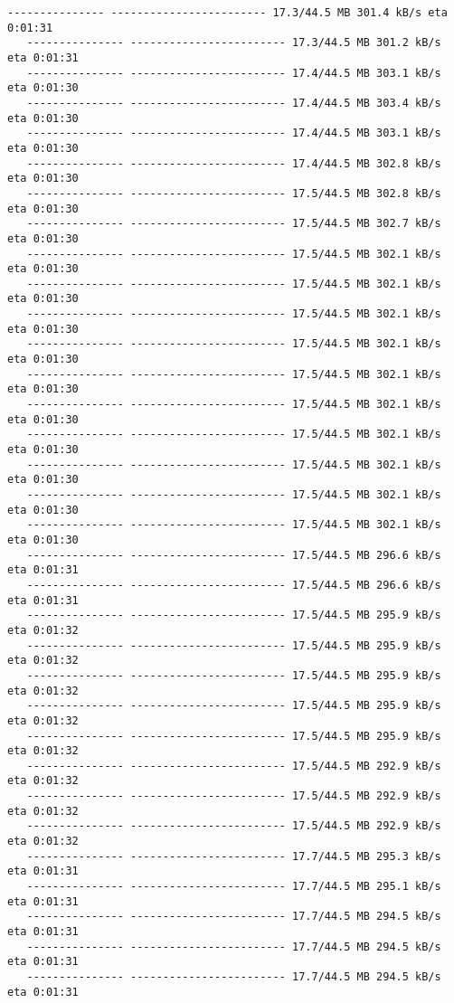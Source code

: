 \documentclass[11pt]{article}
\begin{document}
\begin{Verbatim}[commandchars=\\\{\}]
   --------------- ------------------------ 17.3/44.5 MB 301.4 kB/s eta 0:01:31
   --------------- ------------------------ 17.3/44.5 MB 301.2 kB/s eta 0:01:31
   --------------- ------------------------ 17.4/44.5 MB 303.1 kB/s eta 0:01:30
   --------------- ------------------------ 17.4/44.5 MB 303.4 kB/s eta 0:01:30
   --------------- ------------------------ 17.4/44.5 MB 303.1 kB/s eta 0:01:30
   --------------- ------------------------ 17.4/44.5 MB 302.8 kB/s eta 0:01:30
   --------------- ------------------------ 17.5/44.5 MB 302.8 kB/s eta 0:01:30
   --------------- ------------------------ 17.5/44.5 MB 302.7 kB/s eta 0:01:30
   --------------- ------------------------ 17.5/44.5 MB 302.1 kB/s eta 0:01:30
   --------------- ------------------------ 17.5/44.5 MB 302.1 kB/s eta 0:01:30
   --------------- ------------------------ 17.5/44.5 MB 302.1 kB/s eta 0:01:30
   --------------- ------------------------ 17.5/44.5 MB 302.1 kB/s eta 0:01:30
   --------------- ------------------------ 17.5/44.5 MB 302.1 kB/s eta 0:01:30
   --------------- ------------------------ 17.5/44.5 MB 302.1 kB/s eta 0:01:30
   --------------- ------------------------ 17.5/44.5 MB 302.1 kB/s eta 0:01:30
   --------------- ------------------------ 17.5/44.5 MB 302.1 kB/s eta 0:01:30
   --------------- ------------------------ 17.5/44.5 MB 302.1 kB/s eta 0:01:30
   --------------- ------------------------ 17.5/44.5 MB 302.1 kB/s eta 0:01:30
   --------------- ------------------------ 17.5/44.5 MB 296.6 kB/s eta 0:01:31
   --------------- ------------------------ 17.5/44.5 MB 296.6 kB/s eta 0:01:31
   --------------- ------------------------ 17.5/44.5 MB 295.9 kB/s eta 0:01:32
   --------------- ------------------------ 17.5/44.5 MB 295.9 kB/s eta 0:01:32
   --------------- ------------------------ 17.5/44.5 MB 295.9 kB/s eta 0:01:32
   --------------- ------------------------ 17.5/44.5 MB 295.9 kB/s eta 0:01:32
   --------------- ------------------------ 17.5/44.5 MB 295.9 kB/s eta 0:01:32
   --------------- ------------------------ 17.5/44.5 MB 292.9 kB/s eta 0:01:32
   --------------- ------------------------ 17.5/44.5 MB 292.9 kB/s eta 0:01:32
   --------------- ------------------------ 17.5/44.5 MB 292.9 kB/s eta 0:01:32
   --------------- ------------------------ 17.7/44.5 MB 295.3 kB/s eta 0:01:31
   --------------- ------------------------ 17.7/44.5 MB 295.1 kB/s eta 0:01:31
   --------------- ------------------------ 17.7/44.5 MB 294.5 kB/s eta 0:01:31
   --------------- ------------------------ 17.7/44.5 MB 294.5 kB/s eta 0:01:31
   --------------- ------------------------ 17.7/44.5 MB 294.5 kB/s eta 0:01:31

\end{Verbatim}
\end{document}
